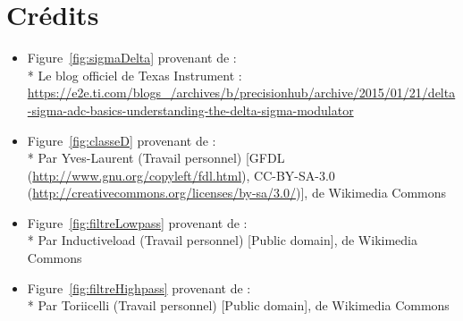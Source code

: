 \documentclass[10pt, oneside, a4paper]{article}
\begin{document}
\section*{Crédits}
    
\begin{itemize}
\item Figure~\ref{fig:sigmaDelta} provenant de :\\*
Le blog officiel de Texas Instrument :
\url{https://e2e.ti.com/blogs_/archives/b/precisionhub/archive/2015/01/21/delta-sigma-adc-basics-understanding-the-delta-sigma-modulator}

\item Figure~\ref{fig:classeD} provenant de :\\*
Par Yves-Laurent (Travail personnel) [GFDL (\url{http://www.gnu.org/copyleft/fdl.html}),
CC-BY-SA-3.0 (\url{http://creativecommons.org/licenses/by-sa/3.0/})], de Wikimedia Commons

\item Figure~\ref{fig:filtreLowpass} provenant de :\\*
Par Inductiveload (Travail personnel) [Public domain], de Wikimedia Commons

\item Figure~\ref{fig:filtreHighpass} provenant de :\\*
Par Toriicelli (Travail personnel) [Public domain], de Wikimedia Commons
\end{itemize}




\appendix
\clearpage



\end{document}
